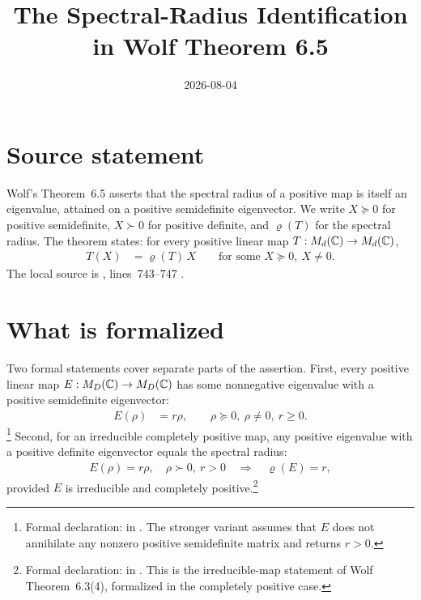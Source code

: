 \documentclass{article}
\title{The Spectral-Radius Identification in Wolf Theorem 6.5}
\author{}
\date{2026-08-04}
\begin{document}
\maketitle
{}

\section{Source statement}

Wolf's Theorem~6.5 asserts that the spectral radius of a positive map is
itself an eigenvalue, attained on a positive semidefinite eigenvector. We
write $X\succeq0$ for positive semidefinite, $X\succ0$ for positive definite,
and $\varrho(T)$ for the spectral radius. The theorem states: for every
positive linear map $T:M_{d}(\mathbb{C})\to M_{d}(\mathbb{C})$,
\begin{align}
  T(X)&=\varrho(T)\,X
  \qquad\text{for some }X\succeq0,\ X\neq0.
  \tag{Wolf Thm.~6.5}
\end{align}
The local source is
, lines~743--747
\cite{Wolf2012Quantum}.

\section{What is formalized}

Two formal statements cover separate parts of the assertion. First, every
positive linear map $E:M_{D}(\mathbb{C})\to M_{D}(\mathbb{C})$ has some nonnegative eigenvalue with
a positive semidefinite eigenvector:
\begin{align}
  E(\rho)&=r\rho,
  \qquad \rho\succeq0,\ \rho\neq0,\ r\ge0.
  \tag{formal existence}
\end{align}
\footnote{Formal declaration:
   in
  . The stronger variant
   assumes that $E$ does not annihilate
  any nonzero positive semidefinite matrix and returns $r>0$.}
Second, for an irreducible completely positive map, any positive eigenvalue
with a positive definite eigenvector equals the spectral radius:
\begin{align}
  E(\rho)=r\rho,\quad \rho\succ0,\ r>0
  \quad\Longrightarrow\quad
  \varrho(E)=r,
  \tag{formal identification}
\end{align}
provided $E$ is irreducible and completely positive.\footnote{Formal
  declaration:
   in
  . This is the
  irreducible-map statement of Wolf Theorem~6.3(4), formalized in the
  completely positive case.}
\end{document}
